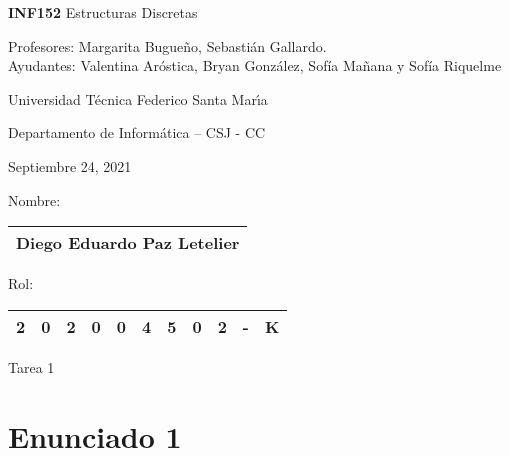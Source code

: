 \documentclass[letterpaper,10pt]{article}
\begin{document}
    
\thispagestyle{empty}
 	
\begin{minipage}[t]{0.6\textwidth}

{\LARGE \textbf{INF152} Estructuras Discretas}

{\large Profesores: Margarita Bugueño, Sebastián Gallardo.}\\
{\large Ayudantes: Valentina Aróstica, Bryan González, Sofía Mañana y Sofía Riquelme}

Universidad T\'ecnica Federico Santa Mar\'{\i}a

Departamento de Inform\'atica -- CSJ - CC 

Septiembre 24, 2021

\end{minipage}
\hfill
\begin{minipage}[t]{0.3\textwidth}
Nombre:

\begin{tabular}{|c|}\hline
    
Diego Eduardo Paz Letelier\\\hline
\end{tabular}

\vspace{0.1cm}

Rol:

\begin{tabular}{|c|c|c|c|c|c|c|c|c|c|c|}\hline

2 & 0 & 2 & 0 & 0 & 4 & 5 & 0 & 2 & - & K\\\hline
\end{tabular}
\end{minipage}

\vspace{0.3cm}

\begin{center}
    \huge Tarea 1
\end{center}


\section{Enunciado 1}
\end{document}
